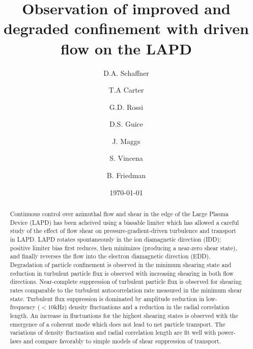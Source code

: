 \documentclass[aps,prl,amsmath,amssymb,preprint,superscriptaddress]{revtex4}
\begin{document}
\title{Observation of improved and degraded confinement with driven flow on the LAPD}
\author{D.A. Schaffner}
\author{T.A Carter}
\author{G.D. Rossi}
\author{D.S. Guice}
\author{J. Maggs}
\author{S. Vincena}
\author{B. Friedman}


\date{\today}

\begin{abstract}
Continuous control over azimuthal flow and shear in the edge of the Large Plasma Device (LAPD) has been acheived using a biasable limiter which has allowed a careful study of the effect of flow shear on pressure-gradient-driven turbulence and transport in LAPD. LAPD rotates spontaneously in the ion diamagnetic direction (IDD); positive limiter bias first reduces, then minimizes (producing a near-zero shear state), and finally reverses the flow into the electron diamagnetic direction (EDD). Degradation of particle confinement is observed in the minimum shearing state and reduction in turbulent particle flux is observed with increasing shearing in both flow directions. Near-complete suppression of turbulent particle flux is observed for shearing rates comparable to the turbulent autocorrelation rate measured in the minimum shear state.  Turbulent flux suppression is dominated by amplitude reduction in low-frequency ($<10$kHz) density fluctuations and a reduction in the radial correlation length. An increase in fluctuations for the highest shearing states is observed with the emergence of a coherent mode which does not lead to net particle transport. The variations of density fluctuation and radial correlation length are fit well with power-laws and compare favorably to simple models of shear suppression of transport.
\end{abstract}

\maketitle
\end{document}
